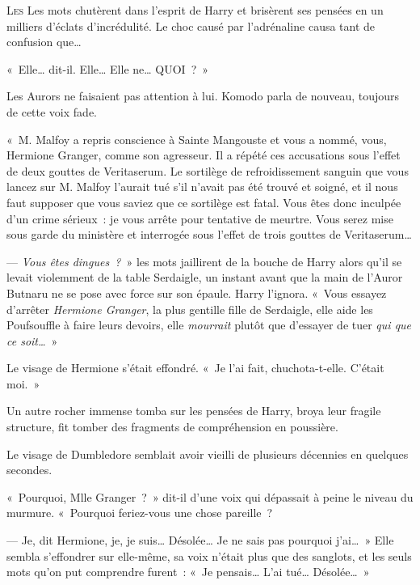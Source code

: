 
\lettrine{L}{es} Les mots chutèrent dans l'esprit de Harry et brisèrent ses pensées en un milliers d'éclats d'incrédulité.
Le choc causé par l'adrénaline causa tant de confusion que…

«~Elle… dit-il.
Elle… Elle ne…
QUOI~?~»

Les Aurors ne faisaient pas attention à lui.
Komodo parla de nouveau, toujours de cette voix fade.

«~M. Malfoy a repris conscience à Sainte Mangouste et vous a nommé, vous, Hermione Granger, comme son agresseur.
Il a répété ces accusations sous l'effet de deux gouttes de Veritaserum.
Le sortilège de refroidissement sanguin que vous lancez sur M. Malfoy l'aurait tué s'il n'avait pas été trouvé et soigné, et il nous faut supposer que vous saviez que ce sortilège est fatal.
Vous êtes donc inculpée d'un crime sérieux~: je vous arrête pour tentative de meurtre.
Vous serez mise sous garde du ministère et interrogée sous l'effet de trois gouttes de Veritaserum…

--- \emph{Vous êtes dingues~?}~» les mots jaillirent de la bouche de Harry alors qu'il se levait violemment de la table Serdaigle, un instant avant que la main de l'Auror Butnaru ne se pose avec force sur son épaule.
Harry l'ignora.
«~Vous essayez d'arrêter \emph{Hermione Granger}, la plus gentille fille de Serdaigle, elle aide les Poufsouffle à faire leurs devoirs, elle \emph{mourrait} plutôt que d'essayer de tuer \emph{qui que ce soit…}~»

Le visage de Hermione s'était effondré.
«~Je l'ai fait, chuchota-t-elle.
C'était moi.~»

Un autre rocher immense tomba sur les pensées de Harry, broya leur fragile structure, fit tomber des fragments de compréhension en poussière.

Le visage de Dumbledore semblait avoir vieilli de plusieurs décennies en quelques secondes.

«~Pourquoi, Mlle Granger~?~»
 dit-il d'une voix qui dépassait à peine le niveau du murmure.
«~Pourquoi feriez-vous une chose pareille~?

--- Je, dit Hermione, je, je suis…
Désolée…
Je ne sais pas pourquoi j'ai…~»
Elle sembla s'effondrer sur elle-même, sa voix n'était plus que des sanglots, et les seuls mots qu'on put comprendre furent~: «~Je pensais…
L'ai tué…
Désolée…~»

